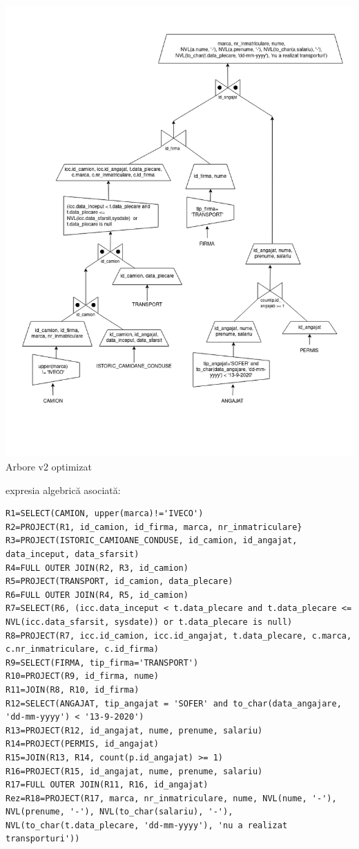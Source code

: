 \documentclass[12pt, a4paper]{article}
\begin{document}
\includegraphics[width=\textwidth]{arbore_v2.png}
\label{arbore_v2}
\centering Arbore v2 optimizat

\newpage{} expresia algebrică asociată:
\begin{lstlisting}
R1=SELECT(CAMION, upper(marca)!='IVECO')
R2=PROJECT(R1, id_camion, id_firma, marca, nr_inmatriculare}
R3=PROJECT(ISTORIC_CAMIOANE_CONDUSE, id_camion, id_angajat, data_inceput, data_sfarsit)
R4=FULL OUTER JOIN(R2, R3, id_camion)
R5=PROJECT(TRANSPORT, id_camion, data_plecare)
R6=FULL OUTER JOIN(R4, R5, id_camion)
R7=SELECT(R6, (icc.data_inceput < t.data_plecare and t.data_plecare <= NVL(icc.data_sfarsit, sysdate)) or t.data_plecare is null)
R8=PROJECT(R7, icc.id_camion, icc.id_angajat, t.data_plecare, c.marca, c.nr_inmatriculare, c.id_firma)
R9=SELECT(FIRMA, tip_firma='TRANSPORT')
R10=PROJECT(R9, id_firma, nume)
R11=JOIN(R8, R10, id_firma)
R12=SELECT(ANGAJAT, tip_angajat = 'SOFER' and to_char(data_angajare, 'dd-mm-yyyy') < '13-9-2020')
R13=PROJECT(R12, id_angajat, nume, prenume, salariu)
R14=PROJECT(PERMIS, id_angajat)
R15=JOIN(R13, R14, count(p.id_angajat) >= 1)
R16=PROJECT(R15, id_angajat, nume, prenume, salariu)
R17=FULL OUTER JOIN(R11, R16, id_angajat)
Rez=R18=PROJECT(R17, marca, nr_inmatriculare, nume, NVL(nume, '-'), NVL(prenume, '-'), NVL(to_char(salariu), '-'), NVL(to_char(t.data_plecare, 'dd-mm-yyyy'), 'nu a realizat transporturi'))
\end{lstlisting}
\end{document}
